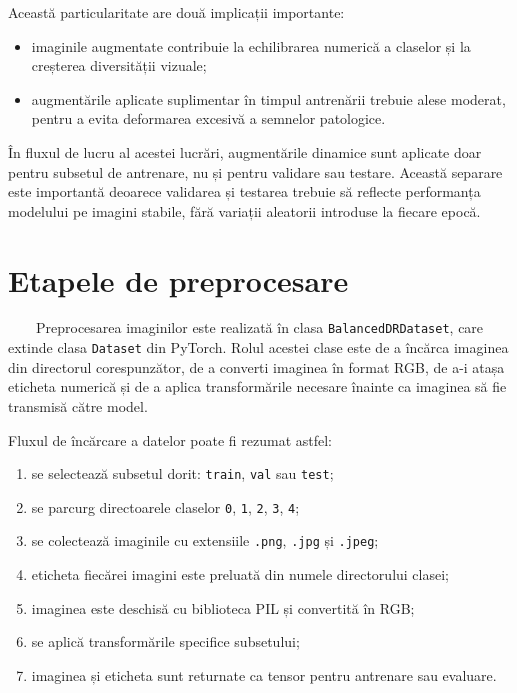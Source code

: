 \documentclass[12pt, a4paper, oneside, romanian]{teza-upb}
\begin{document}
Această particularitate are două implicații importante:

\begin{itemize}
  \item imaginile augmentate contribuie la echilibrarea numerică a claselor și la creșterea diversității vizuale;
  \item augmentările aplicate suplimentar în timpul antrenării trebuie alese moderat, pentru a evita deformarea excesivă a semnelor patologice.
\end{itemize}

În fluxul de lucru al acestei lucrări, augmentările dinamice sunt aplicate doar pentru subsetul de antrenare, nu și pentru validare sau testare. Această separare este importantă deoarece validarea și testarea trebuie să reflecte performanța modelului pe imagini stabile, fără variații aleatorii introduse la fiecare epocă.

\section{Etapele de preprocesare}

\ \ \ \ Preprocesarea imaginilor este realizată în clasa \texttt{BalancedDRDataset}, care extinde clasa \texttt{Dataset} din PyTorch. Rolul acestei clase este de a încărca imaginea din directorul corespunzător, de a converti imaginea în format RGB, de a-i atașa eticheta numerică și de a aplica transformările necesare înainte ca imaginea să fie transmisă către model.
\bigskip

Fluxul de încărcare a datelor poate fi rezumat astfel:

\begin{enumerate}
  \item se selectează subsetul dorit: \texttt{train}, \texttt{val} sau \texttt{test};
  \item se parcurg directoarele claselor \texttt{0}, \texttt{1}, \texttt{2}, \texttt{3}, \texttt{4};
  \item se colectează imaginile cu extensiile \texttt{.png}, \texttt{.jpg} și \texttt{.jpeg};
  \item eticheta fiecărei imagini este preluată din numele directorului clasei;
  \item imaginea este deschisă cu biblioteca PIL și convertită în RGB;
  \item se aplică transformările specifice subsetului;
  \item imaginea și eticheta sunt returnate ca tensor pentru antrenare sau evaluare.
\end{enumerate}
\end{document}
